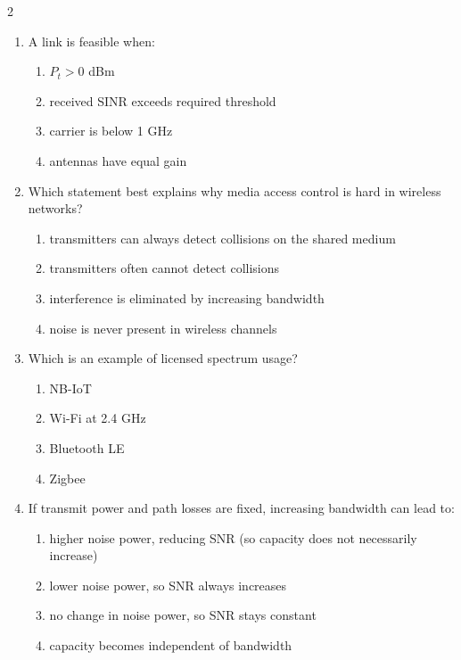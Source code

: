 \begin{multicols}{2}
\begin{enumerate}[leftmargin=*, itemsep=0.4em]
\item A link is feasible when:
\begin{enumerate}[label=\alph*)]
\item $P_t > 0$ dBm
\item received SINR exceeds required threshold
\item carrier is below 1 GHz
\item antennas have equal gain
\end{enumerate}

\item Which statement best explains why media access control is hard in wireless networks?
\begin{enumerate}[label=\alph*)]
\item transmitters can always detect collisions on the shared medium
\item transmitters often cannot detect collisions
\item interference is eliminated by increasing bandwidth
\item noise is never present in wireless channels
\end{enumerate}

\item Which is an example of licensed spectrum usage?
\begin{enumerate}[label=\alph*)]
\item NB-IoT
\item Wi-Fi at 2.4 GHz
\item Bluetooth LE
\item Zigbee
\end{enumerate}

\item If transmit power and path losses are fixed, increasing bandwidth can lead to:
\begin{enumerate}[label=\alph*)]
\item higher noise power, reducing SNR (so capacity does not necessarily increase)
\item lower noise power, so SNR always increases
\item no change in noise power, so SNR stays constant
\item capacity becomes independent of bandwidth
\end{enumerate}

\end{enumerate}
\end{multicols}
